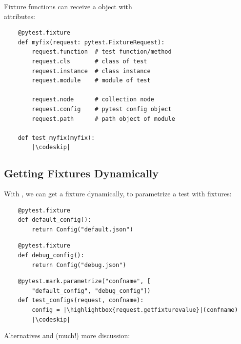 Fixture functions can receive a  object with \\
attributes:

\begin{verbatim}
    @pytest.fixture
    def myfix(request: pytest.FixtureRequest):
        request.function  # test function/method
        request.cls       # class of test
        request.instance  # class instance
        request.module    # module of test

        request.node      # collection node
        request.config    # pytest config object
        request.path      # path object of module

    def test_myfix(myfix):
        |\codeskip|
  \end{verbatim}

\vspace{-.5em}
\subsection{Getting Fixtures Dynamically}

With , we can get a fixture dynamically, to parametrize a test with fixtures:

\begin{verbatim}
    @pytest.fixture
    def default_config():
        return Config("default.json")
\end{verbatim}
\begin{verbatim}
    @pytest.fixture
    def debug_config():
        return Config("debug.json")
\end{verbatim}

\begin{verbatim}
    @pytest.mark.parametrize("confname", [
        "default_config", "debug_config"])
    def test_configs(request, confname):
        config = |\highlightbox{request.getfixturevalue}|(confname)
        |\codeskip|
\end{verbatim}
\vspace{-.25em}

Alternatives and (much!) more discussion:


